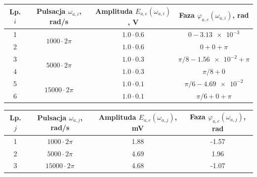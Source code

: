 \begin{table}[htb!]
\begin{center}
\begin{tabular}[c]{| c | c | c | c |} \hline
\textbf{Lp. $i$} & \textbf{Pulsacja $\omega_{a,i}$, rad/s} & \textbf{Amplituda $E_{a,e}(\omega_{a,i})$, V} & \textbf{Faza $\varphi_{a,e}(\omega_{a,i})$, rad} \\ \hline
1 & \multirow{2}{*}{$1000  \cdot 2\pi$} &  $1.0 \cdot 0.6$       & $0 - \num{3.13e-3}$            \\ \cline{1-1} \cline{3-4}
2 &                                     &  $1.0 \cdot 0.6$       & $0 + 0 + \pi$                  \\ \hline
3 & \multirow{2}{*}{$5000  \cdot 2\pi$} &  $1.0 \cdot 0.3$       & $\pi/8 - \num{1.56e-2} + \pi$  \\ \cline{1-1} \cline{3-4}
4 &                                     &  $1.0 \cdot 0.3$       & $\pi/8 + 0$                    \\ \hline
5 & \multirow{2}{*}{$15000 \cdot 2\pi$} &  $1.0 \cdot 0.1$       & $\pi/6 - \num{4.69e-2}$        \\ \cline{1-1} \cline{3-4}
6 &                                     &  $1.0 \cdot 0.1$       & $\pi/6 + 0 +\pi$               \\ \hline
\end{tabular}
\end{center}
\end{table}

\begin{table}[htb!]
\begin{center}
\begin{tabular}[c]{| c | c | S[table-format = 1.2] | S[table-format = +1.2] |} \hline
\textbf{Lp. $j$} & \textbf{Pulsacja $\omega_{a,j}$, rad/s} & \textbf{Amplituda $E_{a,e}(\omega_{a,j})$, mV} & \textbf{Faza $\varphi_{a,e}(\omega_{a,j})$, rad} \\  & $1000  \cdot 2\pi$  &  1.88  & -1.57  \\  & $5000  \cdot 2\pi$  &  4.69  &  1.96  \\  & $15000 \cdot 2\pi$  &  4.68  & -1.07  \\ \hline
\end{tabular}
\end{center}
\end{table}

